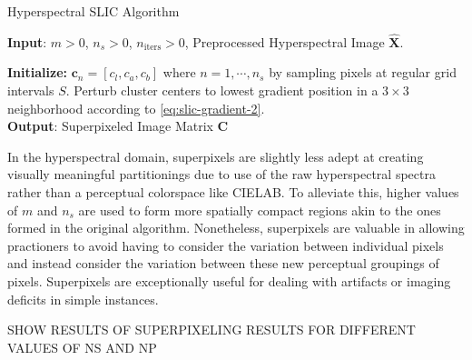 \begin{algorithm}[H]
    \caption{Hyperspectral SLIC Algorithm}
    \textbf{Input}: $m > 0$, $n_s > 0$, $n_{\text{iters}} > 0$, Preprocessed Hyperspectral Image $\hat{\mathbf{X}}$.

    \textbf{Initialize:} $\mathbf{c}_n = [c_{l}, c_{a}, c_{b}]$ where $n = 1, \cdots, n_s$ by sampling pixels at regular grid intervals $S$. Perturb cluster centers to lowest gradient position in a $3 \times 3$ neighborhood according to \eqref{eq:slic-gradient-2}. \\
    
    \textbf{Output}: Superpixeled Image Matrix $\mathbf{C}$
\end{algorithm}


In the hyperspectral domain, superpixels are slightly less adept at creating visually meaningful partitionings due to use of the raw hyperspectral spectra rather than a perceptual colorspace like CIELAB. To alleviate this, higher values of $m$ and $n_s$ are used to form more spatially compact regions akin to the ones formed in the original algorithm. Nonetheless, superpixels are valuable in allowing practioners to avoid having to consider the variation between individual pixels and instead consider the variation between these new perceptual groupings of pixels. Superpixels are exceptionally useful for dealing with artifacts or imaging deficits in simple instances.

SHOW RESULTS OF SUPERPIXELING RESULTS FOR DIFFERENT VALUES OF NS AND NP